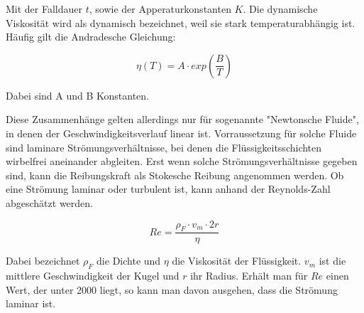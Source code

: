 Mit der Falldauer $t$, sowie der Apperaturkonstanten $K$.
Die dynamische Viskosität wird als dynamisch bezeichnet, weil sie stark 
temperaturabhängig ist. Häufig gilt die Andradesche Gleichung:

\begin{equation}
\eta (T) = A\cdot exp(\frac{B}{T})
\end{equation}

Dabei sind A und B Konstanten. 

Diese Zusammenhänge gelten allerdings nur für sogenannte "Newtonsche Fluide",
in denen der Geschwindigkeitsverlauf linear ist. Vorraussetzung für solche 
Fluide sind laminare Strömungsverhältnisse, bei denen die Flüssigkeitsschichten
wirbelfrei aneinander abgleiten. Erst wenn solche Strömungsverhältnisse gegeben 
sind, kann die Reibungskraft als Stokesche Reibung angenommen werden. 
Ob eine Strömung laminar oder turbulent ist, kann anhand der Reynolds-Zahl 
abgeschätzt werden. 

\begin{equation}
Re = \frac{\rho _F\cdot v_m\cdot 2r}{\eta}
\end{equation}

Dabei bezeichnet $\rho _F$ die Dichte und $\eta$ die Viskosität der Flüssigkeit. 
$v_m$ ist die mittlere Geschwindigkeit der Kugel und $r$ ihr Radius.
Erhält man für $Re$ einen Wert, der unter 2000 liegt, so kann man davon ausgehen, 
dass die Strömung laminar ist. 

\cite{sample}
